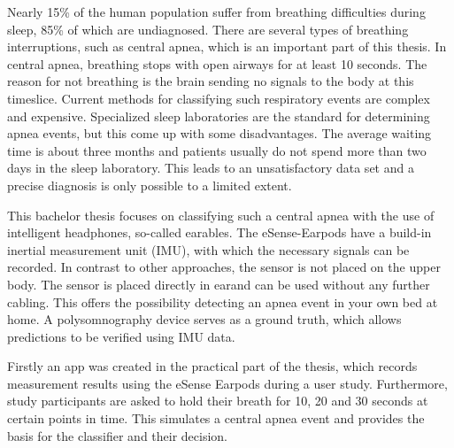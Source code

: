 Nearly 15\% of the human population suffer from breathing difficulties during sleep, 85\% of which are undiagnosed. 
There are several types of breathing interruptions, such as central apnea, which is an important part of this thesis. 
In central apnea, breathing stops with open airways for at least 10 seconds. 
The reason for not breathing is the brain sending no signals to the body at this timeslice.
Current methods for classifying such respiratory events are complex and expensive. 
Specialized sleep laboratories are the standard for determining apnea events, but this come up with some disadvantages. 
The average waiting time is about three months and patients usually do not spend more than two days in the sleep laboratory. 
This leads to an unsatisfactory data set and a precise diagnosis is only possible to a limited extent.

This bachelor thesis focuses on classifying such a central apnea with the use of intelligent headphones, so-called earables. 
The eSense-Earpods have a build-in inertial measurement unit (IMU), with which the necessary signals can be recorded. 
In contrast to other approaches, the sensor is not placed on the upper body.
The sensor is placed directly in earand can be used without any further cabling. 
This offers the possibility detecting an apnea event in your own bed at home. 
A polysomnography device serves as a ground truth, which allows predictions to be verified using IMU data. 

Firstly an app was created in the practical part of the thesis, which records measurement results using the eSense Earpods during a user study. 
Furthermore, study participants are asked to hold their breath for 10, 20 and 30 seconds at certain points in time. 
This simulates a central apnea event and provides the basis for the classifier and their decision.

